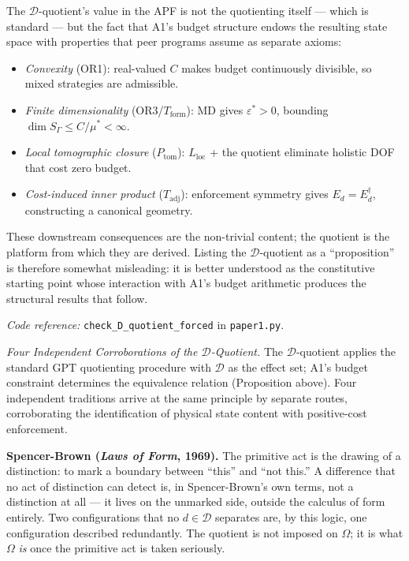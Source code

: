 \documentclass[11pt]{article}
\theoremstyle{remark}
\newcommand{\coderef}[2]{\smallskip\noindent\textit{Code reference:} \texttt{#1} in \texttt{#2}.}
\begin{document}
The $\mathcal{D}$-quotient's value in the APF is not the quotienting itself --- which is standard --- but the fact that A1's budget structure endows the resulting state space with properties that peer programs assume as separate axioms:
\begin{itemize}[nosep,leftmargin=2em,itemsep=2pt]
\item \textit{Convexity} (OR1): real-valued $C$ makes budget continuously divisible, so mixed strategies are admissible.
\item \textit{Finite dimensionality} (OR3/$T_{\mathrm{form}}$): MD gives $\varepsilon^* > 0$, bounding $\dim S_\Gamma \le C/\mu^* < \infty$.
\item \textit{Local tomographic closure} ($P_{\mathrm{tom}}$): $L_{\mathrm{loc}}$ + the quotient eliminate holistic DOF that cost zero budget.
\item \textit{Cost-induced inner product} ($T_{\mathrm{adj}}$): enforcement symmetry gives $E_d = E_d^\dagger$, constructing a canonical geometry.
\end{itemize}
These downstream consequences are the non-trivial content; the quotient is the platform from which they are derived.  Listing the $\mathcal{D}$-quotient as a ``proposition'' is therefore somewhat misleading: it is better understood as the constitutive starting point whose interaction with A1's budget arithmetic produces the structural results that follow.

\coderef{check\_D\_quotient\_forced}{paper1.py}



\medskip\noindent\textit{Four Independent Corroborations of the $\mathcal{D}$-Quotient.}
\noindent The $\mathcal{D}$-quotient applies the standard GPT quotienting procedure with $\mathcal{D}$ as the effect set; A1's budget constraint determines the equivalence relation (Proposition above).  Four independent traditions arrive at the same principle by separate routes, corroborating the identification of physical state content with positive-cost enforcement.

\medskip\noindent\textbf{Spencer-Brown (\emph{Laws of Form}, 1969).}  The primitive act is the drawing of a distinction: to mark a boundary between ``this'' and ``not this.''  A difference that no act of distinction can detect is, in Spencer-Brown's own terms, not a distinction at all --- it lives on the unmarked side, outside the calculus of form entirely.  Two configurations that no $d \in \mathcal{D}$ separates are, by this logic, one configuration described redundantly.  The quotient is not imposed on $\Omega$; it is what $\Omega$ \emph{is} once the primitive act is taken seriously.
\end{document}
